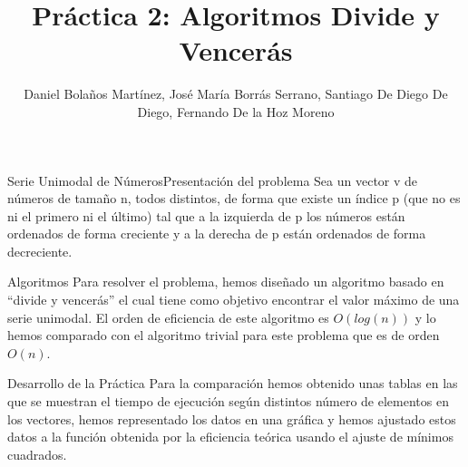 \documentclass[12pt]{beamer}
\author{Daniel Bolaños Martínez, José María Borrás Serrano, Santiago De Diego De Diego, Fernando De la Hoz Moreno}
\title{Práctica 2: Algoritmos Divide y Vencerás}
\institute{ETSIIT}
\date{}
\begin{document}
\begin{frame}
\titlepage
\end{frame}

\begin{frame}{Serie Unimodal de Números}{Presentación del problema}
Sea un vector v de números de tamaño n, todos distintos, de forma que existe un índice p (que no es ni el primero ni el último) tal que a la izquierda de p los números están ordenados de forma creciente y a la derecha de p están ordenados de forma decreciente. 
\end{frame}

\begin{frame}{Algoritmos}
Para resolver el problema, hemos diseñado un algoritmo basado en “divide y vencerás” el cual tiene como objetivo encontrar el valor máximo de una serie unimodal. El orden de eficiencia de este algoritmo es $O(log(n))$ y lo hemos comparado con el algoritmo trivial para este problema que es de orden $O(n)$.
\end{frame}

\begin{frame}{Desarrollo de la Práctica}
Para la comparación hemos obtenido unas tablas en las que se muestran el tiempo de ejecución según distintos número de elementos en los vectores, hemos representado los datos en una gráfica y hemos ajustado estos datos a la función obtenida por la eficiencia teórica usando el ajuste de mínimos cuadrados.
\end{frame}
\end{document}
